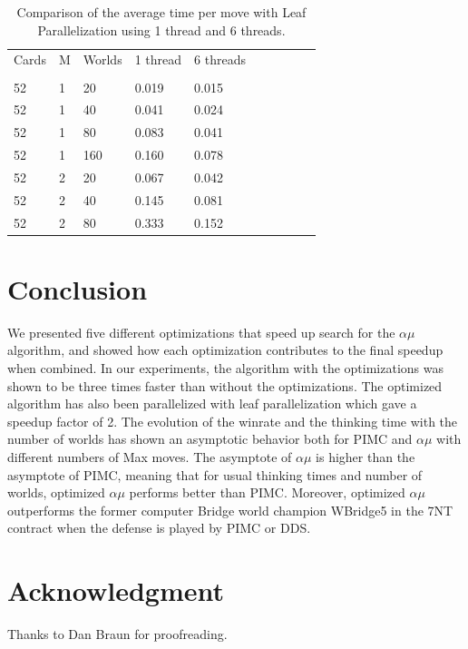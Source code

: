 \documentclass[letterpaper]{article} %
\begin{document}
\begin{table}
  \centering
  \caption{Comparison of the average time per move with Leaf Parallelization using 1 thread and 6 threads.}
  \label{tableLeaf}
  \begin{tabular}{llllllllll}
Cards & M & Worlds & 1 thread &  6 threads \\
      &   &        &    &    &      \\
   52 & 1 &     20 &  0.019 & 0.015 \\
   52 & 1 &     40 &  0.041 & 0.024 \\
   52 & 1 &     80 &  0.083 & 0.041 \\
   52 & 1 &    160 &  0.160 & 0.078 \\
   52 & 2 &     20 &  0.067 & 0.042 \\
   52 & 2 &     40 &  0.145 & 0.081 \\
   52 & 2 &     80 &  0.333 & 0.152 \\
  \end{tabular}
\end{table}

\section{Conclusion}

We presented five different optimizations that speed up search for the $\alpha\mu$ algorithm, and showed how each optimization contributes to the final speedup when combined. In our experiments, the algorithm with the optimizations was shown to be three times faster than without the optimizations. The optimized algorithm has also been parallelized with leaf parallelization which gave a speedup factor of 2. The evolution of the winrate and the thinking time with the number of worlds has shown an asymptotic behavior both for PIMC and $\alpha\mu$ with different numbers of Max moves. The asymptote of $\alpha\mu$ is higher than the asymptote of PIMC, meaning that for usual thinking times and number of worlds, optimized $\alpha\mu$ performs better than PIMC. Moreover, optimized $\alpha\mu$ outperforms the former computer Bridge world champion WBridge5 in the 7NT contract when the defense is played by PIMC or DDS.

\section*{Acknowledgment}

Thanks to Dan Braun for proofreading.


%

\end{document}
